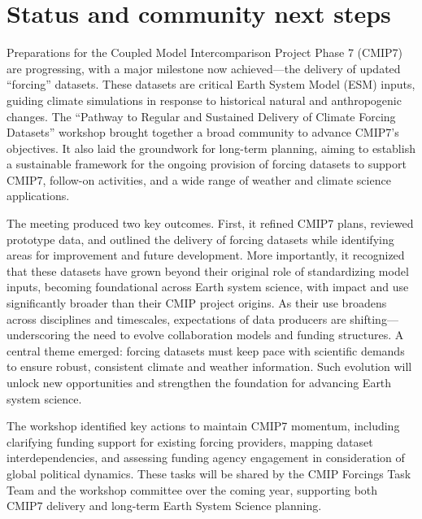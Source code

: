 \documentclass{ametsocV6.1}
\begin{document}
\section*{Status and community next steps}
Preparations for the Coupled Model Intercomparison Project Phase 7 (CMIP7) are progressing, with a major milestone now achieved—the delivery of updated ``forcing'' datasets. These datasets are critical Earth System Model (ESM) inputs, guiding climate simulations in response to historical natural and anthropogenic changes. The ``Pathway to Regular and Sustained Delivery of Climate Forcing Datasets'' workshop brought together a broad community to advance CMIP7’s objectives. It also laid the groundwork for long-term planning, aiming to establish a sustainable framework for the ongoing provision of forcing datasets to support CMIP7, follow-on activities, and a wide range of weather and climate science applications.

The meeting produced two key outcomes. First, it refined CMIP7 plans, reviewed prototype data, and outlined the delivery of forcing datasets while identifying areas for improvement and future development. More importantly, it recognized that these datasets have grown beyond their original role of standardizing model inputs, becoming foundational across Earth system science, with impact and use significantly broader than their CMIP project origins. As their use broadens across disciplines and timescales, expectations of data producers are shifting—underscoring the need to evolve collaboration models and funding structures. A central theme emerged: forcing datasets must keep pace with scientific demands to ensure robust, consistent climate and weather information. Such evolution will unlock new opportunities and strengthen the foundation for advancing Earth system science.

The workshop identified key actions to maintain CMIP7 momentum, including clarifying funding support for existing forcing providers, mapping dataset interdependencies, and assessing funding agency engagement in consideration of global political dynamics. These tasks will be shared by the CMIP Forcings Task Team and the workshop committee over the coming year, supporting both CMIP7 delivery and long-term Earth System Science planning.
\end{document}
